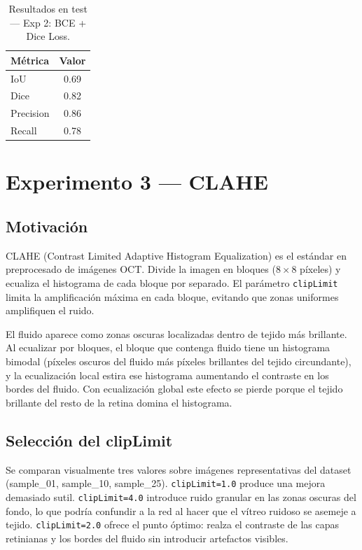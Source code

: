 \documentclass[12pt,a4paper]{article}
\begin{document}
\begin{table}[H]
\centering
\caption{Resultados en test — Exp 2: BCE + Dice Loss.}
\label{tab:exp2}
\begin{tabular}{lc}
\toprule
Métrica & Valor \\
\midrule
IoU       & 0.69 \\
Dice      & 0.82 \\
Precision & 0.86 \\
Recall    & 0.78 \\
\bottomrule
\end{tabular}
\end{table}

\section{Experimento 3 — CLAHE}

\subsection{Motivación}

CLAHE (Contrast Limited Adaptive Histogram Equalization) es el estándar en preprocesado de imágenes OCT. Divide la imagen en bloques ($8\times8$ píxeles) y ecualiza el histograma de cada bloque por separado. El parámetro \texttt{clipLimit} limita la amplificación máxima en cada bloque, evitando que zonas uniformes amplifiquen el ruido.

El fluido aparece como zonas oscuras localizadas dentro de tejido más brillante. Al ecualizar por bloques, el bloque que contenga fluido tiene un histograma bimodal (píxeles oscuros del fluido más píxeles brillantes del tejido circundante), y la ecualización local estira ese histograma aumentando el contraste en los bordes del fluido. Con ecualización global este efecto se pierde porque el tejido brillante del resto de la retina domina el histograma.

\subsection{Selección del clipLimit}

Se comparan visualmente tres valores sobre imágenes representativas del dataset (sample\_01, sample\_10, sample\_25). \texttt{clipLimit=1.0} produce una mejora demasiado sutil. \texttt{clipLimit=4.0} introduce ruido granular en las zonas oscuras del fondo, lo que podría confundir a la red al hacer que el vítreo ruidoso se asemeje a tejido. \texttt{clipLimit=2.0} ofrece el punto óptimo: realza el contraste de las capas retinianas y los bordes del fluido sin introducir artefactos visibles.
\end{document}
